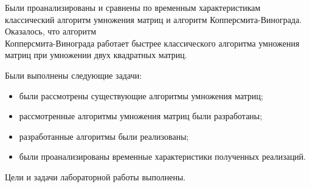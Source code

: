 
Были проанализированы и сравнены по временным характеристикам классический алгоритм умножения матриц и алгоритм Копперсмита-Винограда.
Оказалось, что алгоритм\\Копперсмита-Винограда работает быстрее классического алгоритма умножения матриц при умножении двух квадратных матриц.

Были выполнены следующие задачи:
\begin{itemize}
  \item были рассмотрены существующие алгоритмы умножения матриц;
  \item рассмотренные алгоритмы умножения матриц были разработаны;
  \item разработанные алгоритмы были реализованы;
  \item были проанализированы временные характеристики полученных реализаций.
\end{itemize}

Цели и задачи лабораторной работы выполнены.
